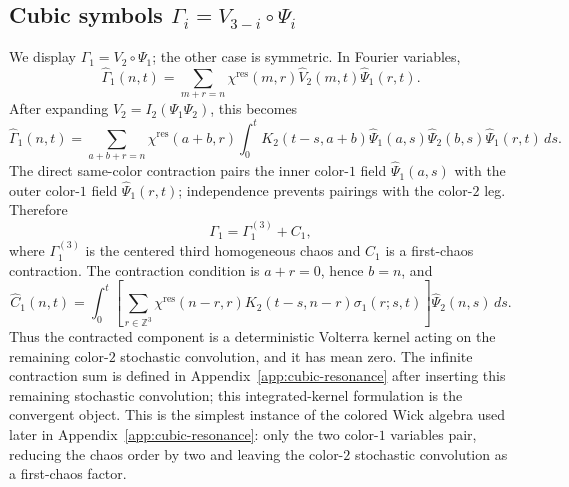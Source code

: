 \documentclass[10pt]{amsart}
\numberwithin{equation}{section}
\theoremstyle{plain}
\theoremstyle{definition}
\theoremstyle{remark}
\begin{document}
\subsection{Cubic symbols \texorpdfstring{$\Gamma_i=V_{3-i}\circ\Psi_i$}{Gamma i = V 3-i o Psi i}}
We display $\Gamma_1=V_2\circ\Psi_1$; the other case is symmetric. In Fourier variables,
\begin{equation}\label{eq:Gamma-fourier}
\widehat\Gamma_1(n,t)=\sum_{m+r=n}\chi^{\mathrm{res}}(m,r)\widehat V_2(m,t)\widehat\Psi_1(r,t).
\end{equation}
After expanding $V_2=I_2(\Psi_1\Psi_2)$, this becomes
\begin{equation}\label{eq:Gamma-expanded-body}
 \widehat\Gamma_1(n,t)
 =\sum_{a+b+r=n}\chi^{\mathrm{res}}(a+b,r)
 \int_0^t K_2(t-s,a+b)
 \widehat\Psi_1(a,s)\widehat\Psi_2(b,s)\widehat\Psi_1(r,t)\,ds.
\end{equation}
The direct same-color contraction pairs the inner color-$1$ field $\widehat\Psi_1(a,s)$ with the outer color-$1$ field $\widehat\Psi_1(r,t)$; independence prevents pairings with the color-$2$ leg. Therefore
\begin{equation}\label{eq:Gamma-wick-body}
 \Gamma_1=\Gamma_1^{(3)}+C_1,
\end{equation}
where $\Gamma_1^{(3)}$ is the centered third homogeneous chaos and $C_1$ is a first-chaos contraction. The contraction condition is $a+r=0$, hence $b=n$, and
\begin{equation}\label{eq:Gamma-C1-body}
 \widehat C_1(n,t)
 =\int_0^t
 \left[\sum_{r\in\mathbb Z^3}\chi^{\mathrm{res}}(n-r,r)K_2(t-s,n-r)\sigma_1(r;s,t)\right]
 \widehat\Psi_2(n,s)\,ds.
\end{equation}
Thus the contracted component is a deterministic Volterra kernel acting on the remaining color-$2$ stochastic convolution, and it has mean zero.  The infinite contraction sum is defined in Appendix~\ref{app:cubic-resonance} after inserting this remaining stochastic convolution; this integrated-kernel formulation is the convergent object.  This is the simplest instance of the colored Wick algebra used later in Appendix~\ref{app:cubic-resonance}: only the two color-$1$ variables pair, reducing the chaos order by two and leaving the color-$2$ stochastic convolution as a first-chaos factor.
\end{document}
